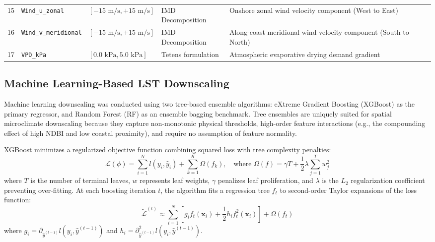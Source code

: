 \documentclass[a4paper,fleqn]{cas-sc}
\begin{document}
\begin{table}
\begin{tabularx}{\columnwidth}{@{}r l l l X@{}}
15 & \texttt{Wind\_u\_zonal} & $[-15\text{ m/s}, +15\text{ m/s}]$ & IMD Decomposition & Onshore zonal wind velocity component (West to East) \\
16 & \texttt{Wind\_v\_meridional} & $[-15\text{ m/s}, +15\text{ m/s}]$ & IMD Decomposition & Along-coast meridional wind velocity component (South to North) \\
17 & \texttt{VPD\_kPa} & $[0.0\text{ kPa}, 5.0\text{ kPa}]$ & Tetens formulation & Atmospheric evaporative drying demand gradient \\
\bottomrule
\end{tabularx}
\end{table}

\subsection{Machine Learning-Based LST Downscaling}
\label{subsec:ml_downscaling}

Machine learning downscaling was conducted using two tree-based ensemble algorithms: eXtreme Gradient Boosting (XGBoost) as the primary regressor, and Random Forest (RF) as an ensemble bagging benchmark. Tree ensembles are uniquely suited for spatial microclimate downscaling because they capture non-monotonic physical thresholds, high-order feature interactions (e.g., the compounding effect of high NDBI and low coastal proximity), and require no assumption of feature normality.

XGBoost minimizes a regularized objective function combining squared loss with tree complexity penalties:
\begin{equation}
    \mathcal{L}(\phi) = \sum_{i=1}^N l\left(y_i, \hat{y}_i\right) + \sum_{k=1}^K \Omega(f_k), \quad \text{where } \Omega(f) = \gamma T + \frac{1}{2} \lambda \sum_{j=1}^T w_j^2
    \label{eq:xgb_loss}
\end{equation}
where $T$ is the number of terminal leaves, $w$ represents leaf weights, $\gamma$ penalizes leaf proliferation, and $\lambda$ is the $L_2$ regularization coefficient preventing over-fitting. At each boosting iteration $t$, the algorithm fits a regression tree $f_t$ to second-order Taylor expansions of the loss function:
\begin{equation}
    \tilde{\mathcal{L}}^{(t)} \approx \sum_{i=1}^N \left[ g_i f_t(\mathbf{x}_i) + \frac{1}{2} h_i f_t^2(\mathbf{x}_i) \right] + \Omega(f_t)
    \label{eq:taylor}
\end{equation}
where $g_i = \partial_{\hat{y}^{(t-1)}} l(y_i, \hat{y}^{(t-1)})$ and $h_i = \partial^2_{\hat{y}^{(t-1)}} l(y_i, \hat{y}^{(t-1)})$.
\end{document}
